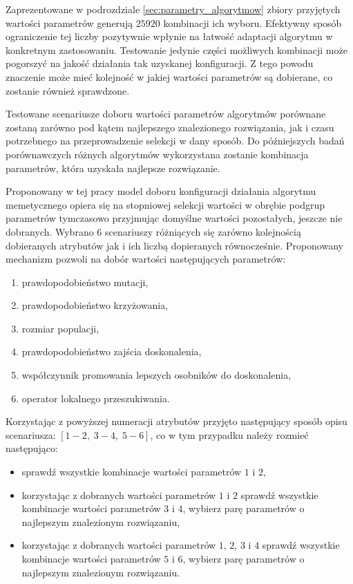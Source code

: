 \par
Zaprezentowane w podrozdziale \ref{sec:parametry_algorytmow} zbiory przyjętych wartości parametrów generują $25920$ kombinacji ich wyboru. Efektywny sposób ograniczenie tej liczby pozytywnie wpłynie na łatwość adaptacji algorytmu w konkretnym zastosowaniu. Testowanie jedynie części możliwych kombinacji może pogorszyć na jakość działania tak uzyskanej konfiguracji. Z tego powodu znaczenie może mieć kolejność w jakiej wartości parametrów są dobierane, co zostanie również sprawdzone. 
\par
Testowane scenariusze doboru wartości parametrów algorytmów porównane zostaną zarówno pod kątem najlepszego znalezionego rozwiązania, jak i czasu potrzebnego na przeprowadzenie selekcji w dany sposób. Do późniejszych badań porównawczych różnych algorytmów wykorzystana zostanie kombinacja parametrów, która uzyskała najlepsze rozwiązanie. 
\par
Proponowany w tej pracy model doboru konfiguracji działania algorytmu memetycznego opiera się na stopniowej selekcji wartości w obrębie podgrup parametrów tymczasowo przyjmując domyślne wartości pozostałych, jeszcze nie dobranych. Wybrano 6 scenariuszy różniących się zarówno kolejnością dobieranych atrybutów jak i ich liczbą dopieranych równocześnie. Proponowany mechanizm pozwoli na dobór wartości następujących parametrów:
\begin{enumerate}
\item prawdopodobieństwo mutacji,
\item prawdopodobieństwo krzyżowania,
\item rozmiar populacji,
\item prawdopodobieństwo zajścia doskonalenia,
\item współczynnik promowania lepszych osobników do doskonalenia,
\item operator lokalnego przeszukiwania.
\end{enumerate}
Korzystając z powyższej numeracji atrybutów przyjęto następujący sposób opisu scenariusza: $[1-2,\; 3-4,\; 5-6]$, co w tym przypadku należy rozmieć następująco:
\begin{itemize}
\item sprawdź wszystkie kombinacje wartości parametrów $1$ i $2$, 
\item korzystając z dobranych wartości parametrów $1$ i $2$ sprawdź wszystkie kombinacje wartości parametrów $3$ i $4$, wybierz parę parametrów o najlepszym znalezionym rozwiązaniu,
\item korzystając z dobranych wartości parametrów $1$, $2$, $3$ i $4$ sprawdź wszystkie kombinacje wartości parametrów $5$ i $6$, wybierz parę parametrów o najlepszym znalezionym rozwiązaniu.
\end{itemize}
